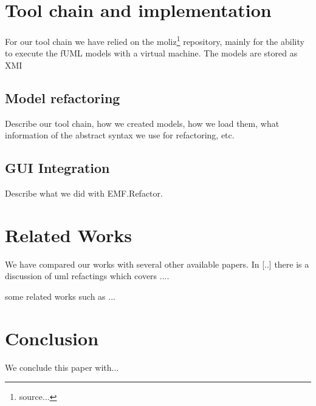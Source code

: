 \documentclass{llncs}
\begin{document}
\section{Tool chain and implementation}
For our tool chain we have relied on the moliz\footnote{source...} repository, mainly for the ability to execute the fUML models with
a virtual machine. The models are stored as XMI 

\subsection{Model refactoring}
Describe our tool chain, how we created models, how we load them, what information of the abstract syntax we use for refactoring, etc.

\subsection{GUI Integration}
Describe what we did with EMF.Refactor.

\section{Related Works}
We have compared our works with several other available papers. In [..] there is a discussion of uml refactings which covers ....

some related works such as ...

\section{Conclusion}
We conclude this paper with...



\end{document}

